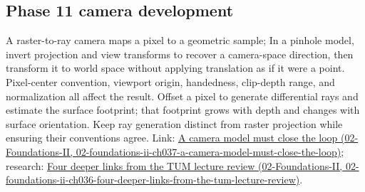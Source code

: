 \subsection{Phase 11 camera development}\label{appendix-1c07d64f5e70-phase-11-camera-development}

A raster-to-ray camera maps a pixel to a geometric sample; In a pinhole model, invert projection and view transforms to recover a camera-space direction, then transform it to world space without applying translation as if it were a point. Pixel-center convention, viewport origin, handedness, clip-depth range, and normalization all affect the result. Offset a pixel to generate differential rays and estimate the surface footprint; that footprint grows with depth and changes with surface orientation. Keep ray generation distinct from raster projection while ensuring their conventions agree. Link: \href{../02-Foundations-II/main.pdf\#nameddest=02-foundations-ii-ch037-a-camera-model-must-close-the-loop}{A camera model must close the loop (02-Foundations-II, 02-foundations-ii-ch037-a-camera-model-must-close-the-loop)}; research: \href{../02-Foundations-II/main.pdf\#nameddest=02-foundations-ii-ch036-four-deeper-links-from-the-tum-lecture-review}{Four deeper links from the TUM lecture review (02-Foundations-II, 02-foundations-ii-ch036-four-deeper-links-from-the-tum-lecture-review)}.
